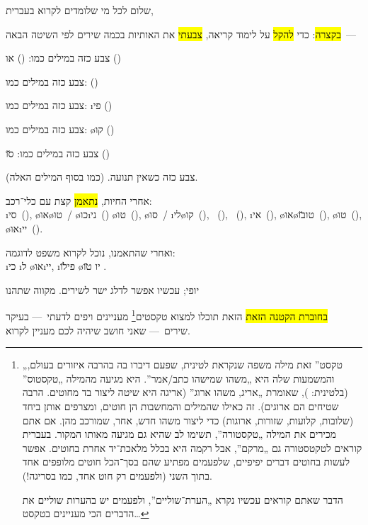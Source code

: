 שלום לכל מי שלומדים לקרוא בעברית,

\begin{framed}
\hl{בקצרה}: כדי \hl{להקל} על לימוד קריאה, \hl{צבעתי} את האותיות בכמה שירים לפי השיטה הבאה~—
\begin{compactitem}
	\item צבע כזה  במילים כמו:  () או  ()
	\item צבע כזה  במילים כמו:  ()
	\item צבע כזה  במילים כמו: \i{פי} ()
	\item צבע כזה  במילים כמו: \o{קו} ()
	\item צבע כזה  במילים כמו: \u{סו} ()
	\item צבע כזה  כשאין תנועה. (כמו בסוף המילים האלה).
\end{compactitem}

אחרי החיות, \hl{נתאמן} קצת עם כלי־רכב:\\
\i{סי}~(),
\o{או}\o{טו}~/ \o{כו}\i{ני}~()
\o{טו}~(),
\o{סו}~/ \i{לי}\o{קו}~(),
~(),
~(),
\i{אי}~(),
\o{או}\o{טו}\u{בו}~(),
\o{טו}~(),
\o{או}\i{יי}~().

ואחרי שהתאמנו, נוכל לקרוא משפט לדוגמה:\\
\i{כי}  \i{ל}  \o{או}\i{יי},  \i{פי}\u{לו} \o{יו}  \u{טו} .

יופי; עכשיו אפשר לדלג ישר לשירים. מקווה שתהנו 
\end{framed}

\hl{בחוברת הקטנה הזאת} הזאת תוכלו למצוא טקסטים\footnote{„טקסט” זאת מילה משפה שנקראת לטינית, שפעם דיברו בה בהרבה איזורים בעולם, והמשמעות שלה היא „משהו שמישהו כתב/אמר”. היא מגיעה מהמילה „טקסטוס” (בלטינית: ), שאומרת „אריג, משהו ארוג” (אריגה היא שיטה ליצור בד מחוטים. הרבה שטיחים הם ארוגים). זה כאילו שהמילים והמחשבות הן חוטים, ומצרפים אותן ביחד (שלובות, קלועות, שזורות, ארוגות) כדי ליצור משהו חדש, אחר, שמורכב מהן. אם אתם מכירים את המילה „טקסטורה”, תשימו לב שהיא גם מגיעה מאותו המקור. בעברית קוראים לטקטסטורה גם „מרקם”, אבל רקמה היא בכלל מלאכת־יד אחרת בחוטים. אפשר לעשות בחוטים דברים יפיפיים, שלפעמים מפתיע שהם בסך־הכל חוטים מלופפים אחד בתוך השני (ולפעמים רק חוט אחד, כמו בסריגה!).
	
	הדבר שאתם קוראים עכשיו נקרא „הערת־שוליים”, ולפעמים יש בהערות שוליים את הדברים הכי מעניינים בטקסט…} מעניינים ויפים לדעתי~— בעיקר שירים~— שאני חושב שיהיה לכם מעניין לקרוא.

